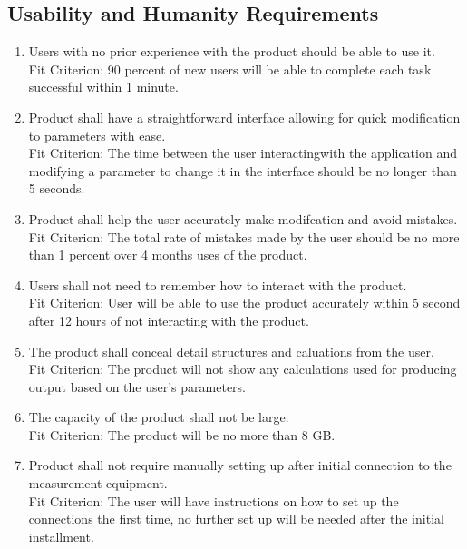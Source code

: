 \documentclass[12pt, titlepage]{article}
\begin{document}
\subsection{Usability and Humanity Requirements}
\begin{adjustwidth}{2.2em}{0pt}
\begin{enumerate}[{NFR-U}1.]
  \item Users with no prior experience with the product should be able to use it.\\
  Fit Criterion: 90 percent of new users will be able to complete each task successful within 1 minute. 
  \item Product shall have a straightforward interface allowing for quick modification to parameters with ease.\\
  Fit Criterion: The time between the user interactingwith the application and modifying a parameter to change it in the interface should be no longer than 5 seconds.
  \item Product shall help the user accurately make modifcation and avoid mistakes.\\
  Fit Criterion: The total rate of mistakes made by the user should be no more than 1 percent over 4 months uses of the product. 
  \item Users shall not need to remember how to interact with the product.\\
  Fit Criterion: User will be able to use the product accurately within 5 second after 12 hours of not interacting with the product.
  \item The product shall conceal detail structures and caluations from the user.\\
  Fit Criterion: The product will not show any calculations used for producing output based on the user's parameters.
  \item The capacity of the product shall not be large.\\
  Fit Criterion: The product will be no more than 8 GB.
  \item Product shall not require manually setting up after initial connection to the measurement equipment.\\
  Fit Criterion: The user will have instructions on how to set up the connections the first time, no further set up will be needed after the initial installment.
\end{enumerate}
\end{adjustwidth}
\end{document}
